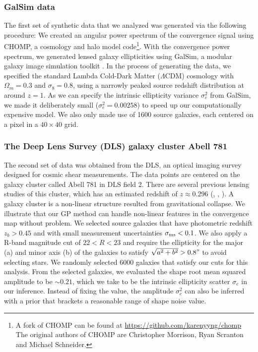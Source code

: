\subsubsection{{\sc GalSim} data}
The first set of synthetic data that we analyzed was generated via the following procedure: 
We created an angular power spectrum of the convergence signal using {\sc
CHOMP}, a cosmology and halo model code\footnote{A fork of {\sc CHOMP} can be
found at \href{https://github.com/karenyyng/chomp}{https://github.com/karenyyng/chomp}
The original authors of CHOMP are Christopher Morrison, Ryan Scranton and Michael Schneider.
}. 
With the convergence power spectrum, we generated lensed   
galaxy ellipticities using {\sc GalSim}, a modular galaxy image
simulation toolkit \citep{Rowe2015}.
In the process of generating the data, we specified 
the standard Lambda Cold-Dark Matter ($\Lambda$CDM) cosmology with $\Omega_m =
0.3$ and $\sigma_8 = 0.8$, using a narrowly peaked source redshift distribution
at around $z = 1$. As we can specify the intrinsic ellipticity variance
$\sigma_e^2$ from {\sc GalSim}, we made it deliberately small ($\sigma_e^2 =
0.00258$) to speed up our computationally expensive model. 
We also only made use of 1600 source galaxies, each centered on a pixel in a 
$40 \times 40$ grid. 
 
\subsubsection{The Deep Lens Survey (DLS) galaxy cluster Abell 781}
The second set of data was obtained from the DLS, an optical imaging survey 
designed for cosmic shear measurements.  The data points
are centered on the galaxy cluster called Abell 781 in DLS field 2.
There are several previous lensing studies of this cluster, which has an estimated redshift
of $z \approx 0.296$ (\citealt{Wittman2014}, \citealt{Cook2012}, \citealt{Sehgal2008}). 
A galaxy cluster is a
non-linear structure resulted from gravitational collapse. We illustrate that
our GP method can handle non-linear features in the convergence map without 
problem. We selected source galaxies that have photometric redshift $z_b >
0.45$ and with small measurement uncertainties $\sigma_{\rm ms} < 0.1$. We also apply  
a R-band magnitude cut of $22 < R < 23$ and require the ellipticity for the
major (a) and minor axis (b) of the galaxies to satisfy $\sqrt{a^2 + b^2} > 0.8"$ 
to avoid selecting stars. We randomly selected 6000 galaxies that satisfy our
cuts for this analysis. From the selected galaxies, we evaluated the shape
root mean squared amplitude to be $\sim 0.21$, which we take to be the
intrinsic ellipticity scatter $\sigma_e$ in our inference.
Instead of fixing the value, the amplitude
$\sigma_e^2$ can also be inferred with a prior that brackets a reasonable range of
shape noise value.  
 
